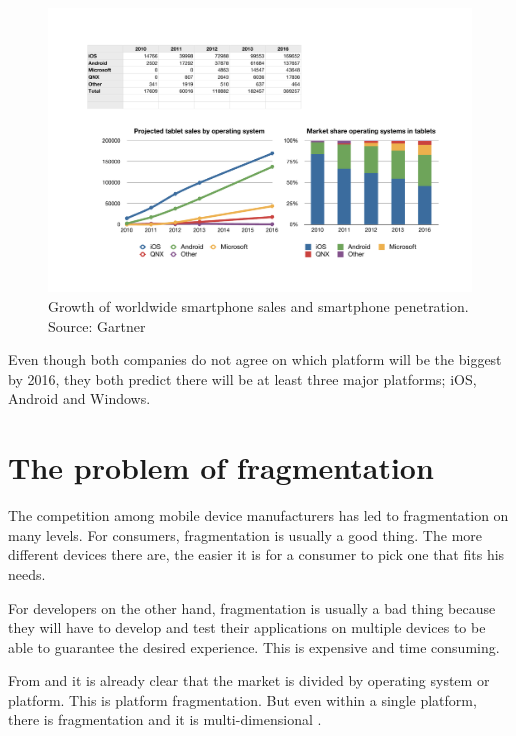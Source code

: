 \begin{figure}[h!]
    \begin{center}
        \includegraphics[width=\textwidth]{figs/tablet.pdf}
        \caption{
            Growth of worldwide smartphone sales and smartphone penetration.\newline
            Source: Gartner \citeGartnerTab
        }
        \label{fig:tablet}
    \end{center}
\end{figure}

Even though both companies do not agree on which platform will be the biggest by 2016, they both predict there will be at least three major platforms; iOS, Android and Windows. 

\section{The problem of fragmentation}

The competition among mobile device manufacturers has led to fragmentation on many levels. For consumers, fragmentation is usually a good thing. The more different devices there are, the easier it is for a consumer to pick one that fits his needs. 

For developers on the other hand, fragmentation is usually a bad thing because they will have to develop and test their applications on multiple devices to be able to guarantee the desired experience. This is expensive and time consuming.

From  and  it is already clear that the market is divided by operating system or platform. This is platform fragmentation. But even within a single platform, there is fragmentation and it is multi-dimensional \cite{Kindel}.

